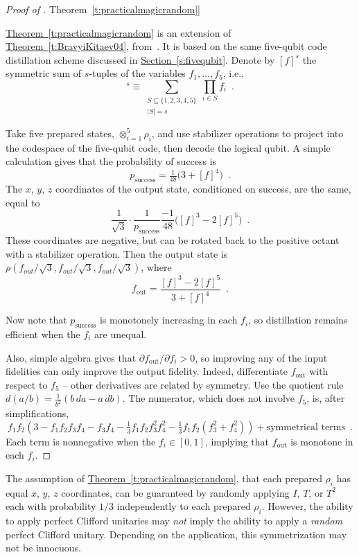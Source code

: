 \documentclass[11pt]{article}
\def\abs #1{\lvert #1\rvert}
\newcommand{\beq}{\begin{equation}}
\newcommand{\eeq}{\end{equation}}
\theoremstyle{note}
\newcommand{\thmref}[1]{\hyperref[#1]{{Theorem~\ref*{#1}}}}
\newcommand{\secref}[1]{\hyperref[#1]{{Section~\ref*{#1}}}}
\begin{document}
\begin{proof}[Proof of \thmref{t:practicalmagicrandom}]

\thmref{t:practicalmagicrandom} is an extension of \thmref{t:BravyiKitaev04}, from~\cite{BravyiKitaev04}.  It is based on the same five-qubit code distillation scheme discussed in \secref{s:fivequbit}.  
Denote by $[f]^s$ the symmetric sum of $s$-tuples of the variables $f_1, \ldots, f_5$, i.e., 
\beq
[f]^s \equiv \sum_{\substack{S \subseteq \{1,2,3,4,5\} \\ \abs{S} = s}} \prod_{i \in S} f_i
 \enspace .
\eeq

Take five prepared states, $\otimes_{i=1}^{5} {\rho_i}$, and use stabilizer operations to project into the codespace of the five-qubit code, then decode the logical qubit.  A simple calculation gives that the probability of success is 
\beq
p_\text{success} = \tfrac{1}{48}\big(3 + [f]^4\big)
 \enspace .
\eeq
The $x$, $y$, $z$ coordinates of the output state, conditioned on success, are the same, equal to 
\beq
\frac{1}{\sqrt{3}} \cdot \frac{1}{p_\text{success}} \frac{-1}{48}\big([f]^3 - 2 [f]^5\big)
 \enspace .
\eeq
These coordinates are negative, but can be rotated back to the positive octant with a stabilizer operation.  Then the output state is $\rho(f_{out}/\sqrt 3, f_{out}/\sqrt 3, f_{out}/\sqrt 3)$, where 
\beq
f_\text{out} = \frac{[f]^3 - 2[f]^5}{3+[f]^4}
 \enspace .
\eeq

Now note that $p_\text{success}$ is monotonely increasing in each $f_i$, so distillation remains efficient when the $f_i$ are unequal.  

Also, simple algebra gives that $\partial f_\text{out} / \partial f_i > 0$, so improving any of the input fidelities can only improve the output fidelity.  
Indeed, differentiate $f_ \text{out}$ with respect to $f_5$ -- other derivatives are related by symmetry.  Use the quotient rule $d (a/b) = \tfrac{1}{b^2}(b\, da - a\, db)$.  The numerator, which does not involve $f_5$, is, after simplifications, 
\beq
f_1 f_2 \left( 3 - f_1 f_2 f_3 f_4 - f_3 f_4 - \tfrac{1}{3} f_1 f_2 f_3^2 f_4^2 - \tfrac{1}{3} f_1 f_2(f_3^2 + f_4^2) \right) + \textrm{symmetrical terms}
 \enspace .
\eeq
Each term is nonnegative when the $f_i \in [0,1]$, implying that $f_\text{out}$ is monotone in each $f_i$. 
\end{proof}

The assumption of \thmref{t:practicalmagicrandom}, that each prepared $\rho_i$ has equal $x$, $y$, $z$ coordinates, can be guaranteed by randomly applying $I$, $T$, or $T^2$ each with probability $1/3$ independently to each prepared $\rho_i$.  However, the ability to apply perfect Clifford unitaries may \emph{not} imply the ability to apply a \emph{random} perfect Clifford unitary.  Depending on the application, this symmetrization may not be innocuous.  
\end{document}
